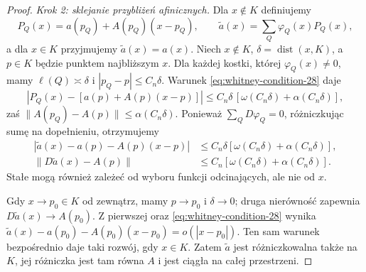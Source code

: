 \documentclass[11pt,a4paper,oneside]{book}
\numberwithin{equation}{chapter}
\theoremstyle{plain}
\theoremstyle{definition}
\theoremstyle{remark}
\begin{document}
\begin{proof}
\emph{Krok 2: sklejanie przybliżeń afinicznych.}
Dla $x\notin K$ definiujemy
\[
 P_Q(x)=a(p_Q)+A(p_Q)(x-p_Q),\qquad
 \widetilde a(x)=\sum_Q\varphi_Q(x)P_Q(x),
\]
a dla $x\in K$ przyjmujemy $\widetilde a(x)=a(x)$.
Niech $x\notin K$, $\delta=\operatorname{dist}(x,K)$,
a $p\in K$ będzie punktem najbliższym $x$.
Dla każdej kostki, której $\varphi_Q(x)\ne0$,
mamy $\ell(Q)\asymp\delta$ i $|p_Q-p|\le C_n\delta$.
Warunek \eqref{eq:whitney-condition-28} daje
\[
 |P_Q(x)-[a(p)+A(p)(x-p)]|
 \le C_n\delta\,[\omega(C_n\delta)+\alpha(C_n\delta)],
\]
zaś $\|A(p_Q)-A(p)\|\le\alpha(C_n\delta)$.
Ponieważ $\sum_QD\varphi_Q=0$, różniczkując
sumę na dopełnieniu, otrzymujemy
\begin{align*}
 |\widetilde a(x)-a(p)-A(p)(x-p)|
 &\le C_n\delta[\omega(C_n\delta)+\alpha(C_n\delta)],\\
 \|D\widetilde a(x)-A(p)\|
 &\le C_n[\omega(C_n\delta)+\alpha(C_n\delta)].
\end{align*}
Stałe mogą również zależeć od wyboru funkcji
odcinających, ale nie od $x$.

Gdy $x\to p_0\in K$ od zewnątrz, mamy $p\to p_0$
i $\delta\to0$; druga nierówność zapewnia
$D\widetilde a(x)\to A(p_0)$. Z pierwszej oraz
\eqref{eq:whitney-condition-28} wynika
$\widetilde a(x)-a(p_0)-A(p_0)(x-p_0)=o(|x-p_0|)$.
Ten sam warunek bezpośrednio daje taki rozwój,
gdy $x\in K$. Zatem $\widetilde a$ jest
różniczkowalna także na $K$, jej różniczka jest
tam równa $A$ i jest ciągła na całej przestrzeni.
\end{proof}
\end{document}

